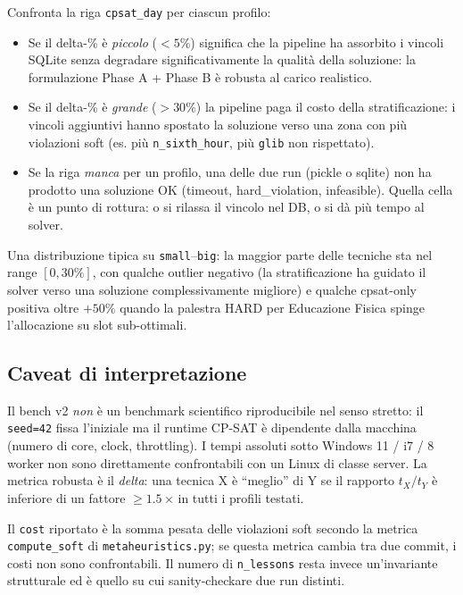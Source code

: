 \begin{ideabox}[title=Lettura della delta-table per profilo]
Confronta la riga \texttt{cpsat\_day} per ciascun profilo:
\begin{itemize}
\item Se il delta-\% \`e \emph{piccolo} ($<5\%$) significa che
  la pipeline ha assorbito i vincoli SQLite senza degradare
  significativamente la qualit\`a della soluzione: la
  formulazione Phase A + Phase B \`e robusta al carico
  realistico.
\item Se il delta-\% \`e \emph{grande} ($>30\%$) la pipeline
  paga il costo della stratificazione: i vincoli aggiuntivi
  hanno spostato la soluzione verso una zona con pi\`u
  violazioni soft (es. pi\`u \texttt{n\_sixth\_hour},
  pi\`u \texttt{glib} non rispettato).
\item Se la riga \emph{manca} per un profilo, una delle due
  run (pickle o sqlite) non ha prodotto una soluzione OK
  (timeout, hard\_violation, infeasible). Quella cella \`e
  un punto di rottura: o si rilassa il vincolo nel DB, o si
  d\`a pi\`u tempo al solver.
\end{itemize}
Una distribuzione tipica su \texttt{small}--\texttt{big}: la
maggior parte delle tecniche sta nel range $[0,30\%]$, con
qualche outlier negativo (la stratificazione ha guidato il
solver verso una soluzione complessivamente migliore) e
qualche cpsat-only positiva oltre $+50\%$ quando la palestra
HARD per Educazione Fisica spinge l'allocazione su slot
sub-ottimali.
\end{ideabox}

\subsection{Caveat di interpretazione}

\begin{avvertenzabox}
Il bench v2 \emph{non} \`e un benchmark scientifico riproducibile
nel senso stretto: il \texttt{seed=42} fissa l'iniziale ma il
runtime CP-SAT \`e dipendente dalla macchina (numero di core,
clock, throttling). I tempi assoluti sotto Windows 11 / i7 /
8\,worker non sono direttamente confrontabili con un Linux di
classe server. La metrica robusta \`e il \emph{delta}: una
tecnica X \`e ``meglio'' di Y se il rapporto $t_X / t_Y$ \`e
inferiore di un fattore $\ge 1.5$\,$\times$ in tutti i profili
testati.

Il \texttt{cost} riportato \`e la somma pesata delle violazioni
soft secondo la metrica \texttt{compute\_soft} di
\texttt{metaheuristics.py}; se questa metrica cambia tra
due commit, i costi non sono confrontabili. Il numero di
\texttt{n\_lessons} resta invece un'invariante strutturale
ed \`e quello su cui sanity-checkare due run distinti.
\end{avvertenzabox}
